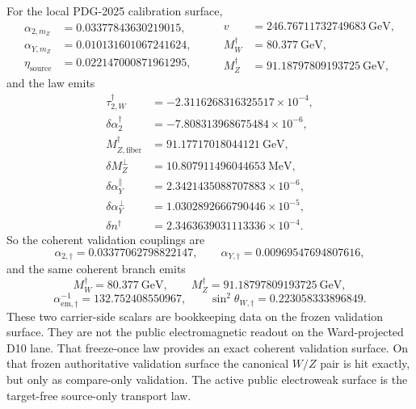 \documentclass[11pt]{article}
\begin{document}
For the local PDG-2025 calibration surface,
\[
\begin{aligned}
\alpha_{2,m_Z}&=0.03377843630219015,\\
\alpha_{Y,m_Z}&=0.010131601067241624,\\
\eta_{\mathrm{source}}&=0.022147000871961295,
\end{aligned}
\qquad
\begin{aligned}
v&=246.76711732749683~\mathrm{GeV},\\
M_W^\dagger&=80.377~\mathrm{GeV},\\
M_Z^\dagger&=91.18797809193725~\mathrm{GeV},
\end{aligned}
\]
and the law emits
\[
\begin{aligned}
\tau_{2,W}^\dagger&=-2.3116268316325517\times10^{-4},\\
\delta\alpha_2^\dagger&=-7.808313968675484\times10^{-6},\\
M_{Z,\mathrm{fiber}}^\dagger&=91.17717018044121~\mathrm{GeV},\\
\delta M_Z^\perp&=10.807911496044653~\mathrm{MeV},\\
\delta\alpha_Y^\parallel&=2.3421435088707883\times10^{-6},\\
\delta\alpha_Y^\perp&=1.0302892666790446\times10^{-5},\\
\delta n^\dagger&=2.3463639031113336\times10^{-4}.
\end{aligned}
\]
So the coherent validation couplings are
\[
\alpha_{2,\dagger}=0.03377062798822147,
\qquad
\alpha_{Y,\dagger}=0.00969547694807616,
\]
and the same coherent branch emits
\[
M_W^\dagger=80.377~\mathrm{GeV},
\qquad
M_Z^\dagger=91.18797809193725~\mathrm{GeV},
\]
\[
\alpha_{\mathrm{em},\dagger}^{-1}=132.752408550967,
\qquad
\sin^2\theta_{W,\dagger}=0.223058333896849.
\]
These two carrier-side scalars are bookkeeping data on the frozen validation surface. They are not
the public electromagnetic readout on the Ward-projected D10 lane.
That freeze-once law provides an exact coherent validation surface. On that frozen authoritative
validation surface the canonical \(W/Z\) pair is hit exactly, but only as compare-only validation.
The active public electroweak surface is the target-free source-only transport law.
\end{document}
